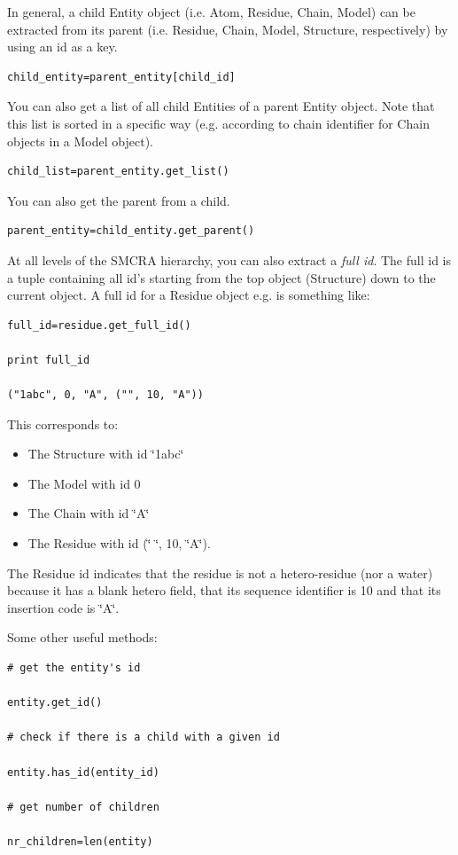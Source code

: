 \documentclass{report}
\begin{document}
In general, a child Entity object (i.e. Atom, Residue, Chain, Model) can be
extracted from its parent (i.e. Residue, Chain, Model, Structure, respectively)
by using an id as a key.

\begin{verbatim}
child_entity=parent_entity[child_id]
\end{verbatim}

You can also get a list of all child Entities of a parent Entity object. Note
that this list is sorted in a specific way (e.g. according to chain identifier
for Chain objects in a Model object).

\begin{verbatim}
child_list=parent_entity.get_list()
\end{verbatim}

You can also get the parent from a child.

\begin{verbatim}
parent_entity=child_entity.get_parent()
\end{verbatim}

At all levels of the SMCRA hierarchy, you can also extract a \emph{full id}.
The full id is a tuple containing all id's starting from the top object (Structure)
down to the current object. A full id for a Residue object e.g. is something
like:

\begin{verbatim}
full_id=residue.get_full_id()

print full_id

("1abc", 0, "A", ("", 10, "A"))
\end{verbatim}

This corresponds to:

\begin{itemize}
\item The Structure with id \char`\"{}1abc\char`\"{}
\item The Model with id 0
\item The Chain with id \char`\"{}A\char`\"{}
\item The Residue with id (\char`\"{} \char`\"{}, 10, \char`\"{}A\char`\"{}).
\end{itemize}
The Residue id indicates that the residue is not a hetero-residue (nor a water)
because it has a blank hetero field, that its sequence identifier is 10 and
that its insertion code is \char`\"{}A\char`\"{}.

Some other useful methods:

\begin{verbatim}
# get the entity's id

entity.get_id()

# check if there is a child with a given id

entity.has_id(entity_id)

# get number of children

nr_children=len(entity)
\end{verbatim}
\end{document}
